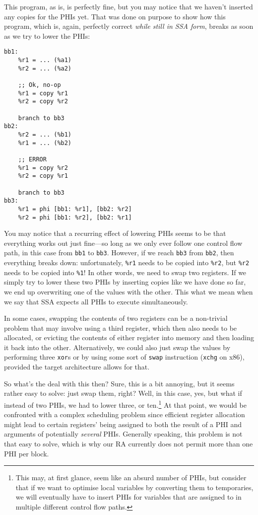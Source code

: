 \documentclass[12pt]{report}
\begin{document}
This program, as is, is perfectly fine, but you may notice that we haven't inserted any copies for the PHIs yet. That was done on purpose
to show how this program, which is, again, perfectly correct \textit{while still in SSA form}, breaks as soon as we try to lower the PHIs:
\begin{Verbatim}
bb1:
    %r1 = ... (%a1)
    %r2 = ... (%a2)

    ;; Ok, no-op
    %r1 = copy %r1
    %r2 = copy %r2

    branch to bb3
bb2:
    %r2 = ... (%b1)
    %r1 = ... (%b2)

    ;; ERROR
    %r1 = copy %r2
    %r2 = copy %r1

    branch to bb3
bb3:
    %r1 = phi [bb1: %r1], [bb2: %r2]
    %r2 = phi [bb1: %r2], [bb2: %r1]
\end{Verbatim}

\noindent You may notice that a recurring effect of lowering PHIs seems to be that everything works out just fine—so long as we only ever
follow one control flow path, in this case from \verb|bb1| to \verb|bb3|. However, if we reach \verb|bb3| from \verb|bb2|, then everything
breaks down: unfortunately, \verb|%r1| needs to be copied into \verb|%r2|, but \verb|%r2| needs to be copied into \verb|%1|! In
other words, we need to swap two registers. If we simply try to lower these two PHIs by inserting copies like we have done so far, we end
up overwriting one of the values with the other. This what we mean when we say that SSA expects all PHIs to execute simultaneously.

In some cases, swapping the contents of two registers can be a non-trivial problem that may involve using a third register, which then also
needs to be allocated, or evicting the contents of either register into memory and then loading it back into the other. Alternatively, we
could also just swap the values by performing three \verb|xor|s or by using some sort of \verb|swap| instruction (\verb|xchg| on
x86), provided the target architecture allows for that.

So what's the deal with this then? Sure, this is a bit annoying, but it seems rather easy to solve: just swap them, right? Well, in this
case, yes, but what if instead of two PHIs, we had to lower three, or ten.\footnote{This may, at first glance, seem like an absurd number of
PHIs, but consider that if we want to optimise local variables by converting them to temporaries, we will eventually have to insert PHIs for
variables that are assigned to in multiple different control flow paths.} At that point, we would be confronted with a complex scheduling
problem since efficient register allocation might lead to certain registers’ being assigned to both the result of a PHI and arguments of
potentially \textit{several} PHIs. Generally speaking, this problem is not that easy to solve, which is why our RA currently does not
permit more than one PHI per block.
\end{document}
